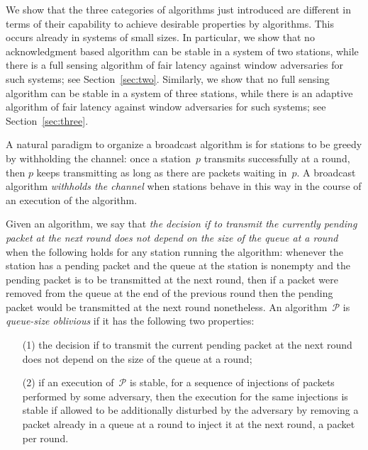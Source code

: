 \documentclass[11pt]{article}
\newcommand{\cP}{\mathcal{P}}
\begin{document}
We show that the three categories of algorithms just introduced are different in terms of their capability to achieve  desirable properties by algorithms.
This occurs already in systems of small sizes.
In particular, we show that no acknowledgment based algorithm can be stable in a system of two stations, while there is a full sensing algorithm of  fair latency against window adversaries for such systems; see Section~\ref{sec:two}.
Similarly, we show  that no full sensing algorithm can be stable in a system of three stations, while there is an adaptive algorithm of fair latency against window adversaries for such systems; see Section~\ref{sec:three}.

A natural paradigm to organize a broadcast algorithm is for stations to be greedy by withholding the channel: once a station~$p$ transmits successfully at a round, then $p$ keeps transmitting as long as there are  packets waiting in~$p$.
A broadcast algorithm \emph{withholds the channel} when stations behave in this  way in the course of an execution of the algorithm.

Given an algorithm, we say that \emph{the decision if to transmit the currently pending packet at the next round does not depend on the size of the queue at a round} when the following holds for any station running the algorithm: whenever the station has a pending packet and the queue at the station is nonempty and the pending packet is to be transmitted at the next round, then if a packet were removed from the queue at the end of the previous round then the pending packet would be transmitted at the next round nonetheless.
An  algorithm~$\cP$ is \emph{queue-size oblivious} if it has the following two properties:

\begin{enumerate}
\item[(1)] 
the decision if to transmit the current pending packet at the next round does not depend on the size of the queue at a round;
\item[(2)] 
if an execution of~$\cP$ is stable, for a sequence of injections of packets performed by some adversary, then the execution for the same injections is stable if allowed to be additionally disturbed by the adversary by removing a packet already in a queue at a round to inject it at the next round, a packet per round. 
\end{enumerate}
\end{document}

